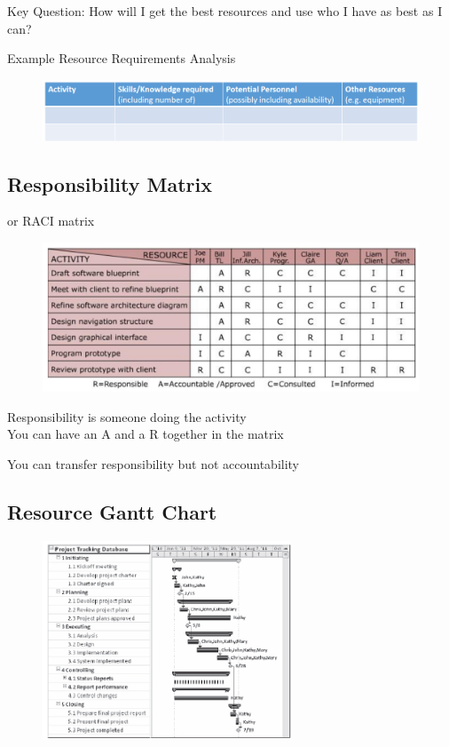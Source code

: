 \documentclass[]{project_plan}
\begin{document}
Key Question: How will I get the best resources and use who I have as best as I can?

\newpage

Example Resource Requirements Analysis
\begin{figure}[h!]
  \centering
  \includegraphics[width=\linewidth]{resource_requirements_analysis.png}
\end{figure}

\subsection{Responsibility Matrix}
or RACI matrix
\begin{figure}[h!]
  \centering
  \includegraphics[width=\linewidth]{raci_matrix.png}
\end{figure}

Responsibility is someone doing the activity\\
You can have an A and a R together in the matrix

You can transfer responsibility but not accountability

\subsection{Resource Gantt Chart}

\begin{figure}[h!]
  \centering
  \includegraphics[width=20em]{resource_gantt_chart.png}
\end{figure}
\end{document}
